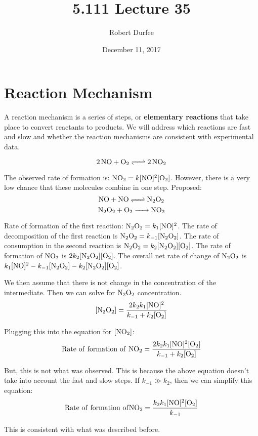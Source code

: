 \documentclass{article}
\title{ 5.111 Lecture 35 }
\author{ Robert Durfee }
\date{ December 11, 2017 }
\begin{document}
\maketitle

\section{ Reaction Mechanism }

A reaction mechanism is a series of steps, or \textbf{elementary reactions} that
take place to convert reactants to products. We will address which reactions are
fast and slow and whether the reaction mechanisms are consistent with
experimental data. 

$$ \ce{ 2NO + O_{2} <=> 2NO_{2} } $$

The observed rate of formation is: $\ce{ NO_{2} } = k[ \ce{ NO } ]^{2}[ \ce{
O_{2} } ] $. However, there is a very low chance that these molecules combine in
one step. Proposed:
$$ \ce{ NO + NO <=> N_{2}O_{2} } $$
$$ \ce{ N_{2}O_{2} + O_{2} -> NO_{2} } $$

Rate of formation of the first reaction: $\ce{ N_{2}O_{2} } = k_{1} [ \ce{ NO }
]^{2}$. The rate of decomposition of the first reaction is $ \ce{ N_{2}O_{2} } =
k_{-1} [ \ce{ N_{2}O_{2} } ]$. The rate of consumption in the second reaction is
$ \ce{ N_{2}O_{2} } = k_{2}[ \ce{ N_{2}O_{2} } ][ \ce{ O_{2} } ]$. The rate of
formation of $\ce{ NO_{2} }$ is $2k_{2}[ \ce{ N_{2}O_{2} } ][ \ce{ O_{2} } ]$. The overall
net rate of change of $\ce{ N_{2}O_{2} }$ is $k_{1}[ \ce{ NO } ]^{2} - k_{-1}[
\ce{ N_{2}O_{2} } ] - k_{2}[ \ce{ N_{2}O_{2} } ][ \ce{ O_{2} } ]$.

We then assume that there is not change in the concentration of the
intermediate. Then we can solve for $\ce{ N_{2}O_{2} }$ concentration. 
$$ [ \ce{ N_{2}O_{2} } ] = \frac{ 2 k_{2}k_{1} [ \ce{ NO } ]^{2} }{ k_{-1} +
k_{2} [ \ce{ O_{2} } ] } $$

Plugging this into the equation for $[ \ce{ NO_2 } ]$:
$$ \mathrm{ Rate\ of\ formation\ of\ } \ce{ NO_{2} } = \frac{ 2 k_{2} k_{1} [
\ce{ NO } ]^{2} [ \ce{ O_{2} } ] }{ k_{-1} + k_{2}[ \ce{ O_{2} } ] }$$

But, this is not what was observed. This is because the above equation doesn't
take into account the fast and slow steps. If $k_{-1} \gg k_{2}$, then we can
simplify this equation:
$$ \mathrm{ Rate\ of\ formation\ of } \ce{ NO_{2} } = \frac{ k_{2}k_{1} [ \ce{
NO } ]^{2}[ \ce{ O_{2} } ] }{ k_{-1} } $$

This is consistent with what was described before. 
\end{document}
